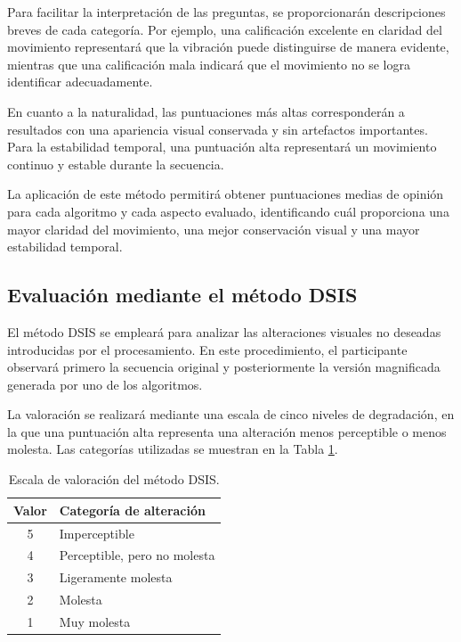 Para facilitar la interpretación de las preguntas, se proporcionarán descripciones breves de cada categoría. Por ejemplo, una calificación excelente en claridad del movimiento representará que la vibración puede distinguirse de manera evidente, mientras que una calificación mala indicará que el movimiento no se logra identificar adecuadamente.

En cuanto a la naturalidad, las puntuaciones más altas corresponderán a resultados con una apariencia visual conservada y sin artefactos importantes. Para la estabilidad temporal, una puntuación alta representará un movimiento continuo y estable durante la secuencia.

La aplicación de este método permitirá obtener puntuaciones medias de opinión para cada algoritmo y cada aspecto evaluado, identificando cuál proporciona una mayor claridad del movimiento, una mejor conservación visual y una mayor estabilidad temporal.

\subsection{Evaluación mediante el método DSIS}

El método \gls{DSIS} se empleará para analizar las alteraciones visuales no deseadas introducidas por el procesamiento. En este procedimiento, el participante observará primero la secuencia original y posteriormente la versión magnificada generada por uno de los algoritmos.

La valoración se realizará mediante una escala de cinco niveles de degradación, en la que una puntuación alta representa una alteración menos perceptible o menos molesta. Las categorías utilizadas se muestran en la Tabla \ref{tab:escala_dsis}.

\begin{table}[H]
\centering
\caption{Escala de valoración del método DSIS.}
\label{tab:escala_dsis}
\begin{tabular}{|c|p{8cm}|}
\hline
\textbf{Valor} & \textbf{Categoría de alteración} \\ \hline
5 & Imperceptible \\ \hline
4 & Perceptible, pero no molesta \\ \hline
3 & Ligeramente molesta \\ \hline
2 & Molesta \\ \hline
1 & Muy molesta \\ \hline
\end{tabular}
\end{table}

